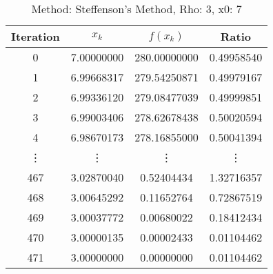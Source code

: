 \begin{table}
\centering
\caption{Method: Steffenson's Method, Rho: 3, x0: 7}
\label{tab:table_Steffenson's_Method_3_7}
\begin{tabular}{c c c c}
\toprule
Iteration &      $x_k$ &     $f(x_k)$ &      Ratio \\
\midrule
        0 & 7.00000000 & 280.00000000 & 0.49958540 \\
        1 & 6.99668317 & 279.54250871 & 0.49979167 \\
        2 & 6.99336120 & 279.08477039 & 0.49999851 \\
        3 & 6.99003406 & 278.62678438 & 0.50020594 \\
        4 & 6.98670173 & 278.16855000 & 0.50041394 \\
   \vdots &     \vdots &       \vdots &     \vdots \\
      467 & 3.02870040 &   0.52404434 & 1.32716357 \\
      468 & 3.00645292 &   0.11652764 & 0.72867519 \\
      469 & 3.00037772 &   0.00680022 & 0.18412434 \\
      470 & 3.00000135 &   0.00002433 & 0.01104462 \\
      471 & 3.00000000 &   0.00000000 & 0.01104462 \\
\bottomrule
\end{tabular}
\end{table}
